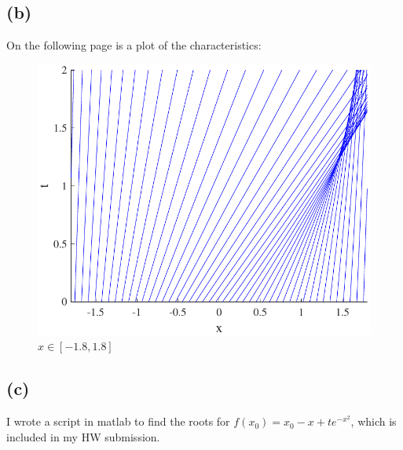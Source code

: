 \documentclass{article}
\begin{document}
\subsection*{(b)}
On the following page is a plot of the characteristics:
\begin{figure}[!htbp]
  \centering
    \includegraphics[width=\textwidth]{hw_13_plot1.pdf}
    \caption{$x \in [-1.8, 1.8]$}
\end{figure}
\FloatBarrier
\subsection*{(c)}
I wrote a script in matlab to find the roots for $f(x_0) = x_0 - x + te^{-x^2}$, which is included in my HW submission.
\end{document}
